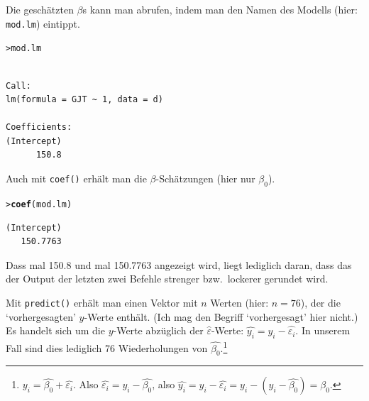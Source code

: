 \documentclass[oneside, 10pt]{book}\usepackage[]{graphicx}\usepackage[]{xcolor}
\makeatletter
\newcommand{\hlstd}[1]{\textcolor[rgb]{0.345,0.345,0.345}{#1}}%
\newcommand{\hlkwd}[1]{\textcolor[rgb]{0.737,0.353,0.396}{\textbf{#1}}}%
\newenvironment{kframe}{%
 \def\at@end@of@kframe{}%
 \ifinner\ifhmode%
  \def\at@end@of@kframe{\end{minipage}}%
  \begin{minipage}{\columnwidth}%
 \fi\fi%
 \def\FrameCommand##1{\hskip\@totalleftmargin \hskip-\fboxsep
 \colorbox{shadecolor}{##1}\hskip-\fboxsep
     \hskip-\linewidth \hskip-\@totalleftmargin \hskip\columnwidth}%
 \MakeFramed {\advance\hsize-\width
   \@totalleftmargin\z@ \linewidth\hsize
   \@setminipage}}%
 {\par\unskip\endMakeFramed%
 \at@end@of@kframe}
\newenvironment{knitrout}{}{} %
\makeatother
\begin{document}
Die geschätzten $\beta$s kann man abrufen, indem
man den Namen des Modells (hier: \texttt{mod.lm})
eintippt.

\begin{knitrout}
\color{fgcolor}\begin{kframe}
\begin{alltt}
\hlstd{> }\hlstd{mod.lm}
\end{alltt}
\begin{verbatim}

Call:
lm(formula = GJT ~ 1, data = d)

Coefficients:
(Intercept)  
      150.8  
\end{verbatim}
\end{kframe}
\end{knitrout}

Auch mit \texttt{coef()} erhält man die $\beta$-Schätzungen (hier nur $\beta_0$).

\begin{knitrout}
\color{fgcolor}\begin{kframe}
\begin{alltt}
\hlstd{> }\hlkwd{coef}\hlstd{(mod.lm)}
\end{alltt}
\begin{verbatim}
(Intercept) 
   150.7763 
\end{verbatim}
\end{kframe}
\end{knitrout}

Dass mal 150.8 und mal 150.7763 angezeigt wird, liegt lediglich daran, dass das der Output
der letzten zwei Befehle strenger bzw.\ lockerer gerundet wird.

Mit \texttt{predict()} erhält man einen Vektor mit $n$ Werten (hier: $n = 76$),
der die `vorhergesagten' $y$-Werte enthält.
(Ich mag den Begriff `vorhergesagt' hier nicht.)
Es handelt sich um die $y$-Werte abzüglich der $\hat{\varepsilon}$-Werte: $\widehat{y_i} = y_i - \widehat{\varepsilon_i}$.
In unserem Fall sind dies lediglich 76 Wiederholungen von $\widehat{\beta_0}$.\footnote{$y_i = \widehat{\beta_0} + \widehat{\varepsilon_i}$. Also $\widehat{\varepsilon_i} = y_i - \widehat{\beta_0}$, also $\widehat{y_i} = y_i - \widehat{\varepsilon_i} = y_i - (y_i - \widehat{\beta_0}) =  \widehat{\beta_0}$.}
\end{document}
